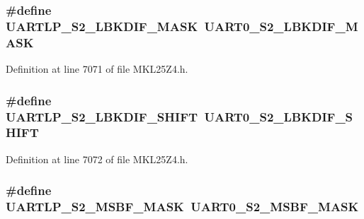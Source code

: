 \subsubsection[{\texorpdfstring{U\+A\+R\+T\+L\+P\+\_\+\+S2\+\_\+\+L\+B\+K\+D\+I\+F\+\_\+\+M\+A\+SK}{UARTLP_S2_LBKDIF_MASK}}]{\setlength{\rightskip}{0pt plus 5cm}\#define U\+A\+R\+T\+L\+P\+\_\+\+S2\+\_\+\+L\+B\+K\+D\+I\+F\+\_\+\+M\+A\+SK~{\bf U\+A\+R\+T0\+\_\+\+S2\+\_\+\+L\+B\+K\+D\+I\+F\+\_\+\+M\+A\+SK}}\hypertarget{group___backward___compatibility___symbols_gaa43c6661dd27a409a7e7e17506c6bfde}{}\label{group___backward___compatibility___symbols_gaa43c6661dd27a409a7e7e17506c6bfde}


Definition at line 7071 of file M\+K\+L25\+Z4.\+h.

\subsubsection[{\texorpdfstring{U\+A\+R\+T\+L\+P\+\_\+\+S2\+\_\+\+L\+B\+K\+D\+I\+F\+\_\+\+S\+H\+I\+FT}{UARTLP_S2_LBKDIF_SHIFT}}]{\setlength{\rightskip}{0pt plus 5cm}\#define U\+A\+R\+T\+L\+P\+\_\+\+S2\+\_\+\+L\+B\+K\+D\+I\+F\+\_\+\+S\+H\+I\+FT~{\bf U\+A\+R\+T0\+\_\+\+S2\+\_\+\+L\+B\+K\+D\+I\+F\+\_\+\+S\+H\+I\+FT}}\hypertarget{group___backward___compatibility___symbols_ga82b6d0e62d2a3a3eeed35d124fb2b31c}{}\label{group___backward___compatibility___symbols_ga82b6d0e62d2a3a3eeed35d124fb2b31c}


Definition at line 7072 of file M\+K\+L25\+Z4.\+h.

\subsubsection[{\texorpdfstring{U\+A\+R\+T\+L\+P\+\_\+\+S2\+\_\+\+M\+S\+B\+F\+\_\+\+M\+A\+SK}{UARTLP_S2_MSBF_MASK}}]{\setlength{\rightskip}{0pt plus 5cm}\#define U\+A\+R\+T\+L\+P\+\_\+\+S2\+\_\+\+M\+S\+B\+F\+\_\+\+M\+A\+SK~{\bf U\+A\+R\+T0\+\_\+\+S2\+\_\+\+M\+S\+B\+F\+\_\+\+M\+A\+SK}}\hypertarget{group___backward___compatibility___symbols_ga41b1656314af8d525f36c119201f43a6}{}\label{group___backward___compatibility___symbols_ga41b1656314af8d525f36c119201f43a6}


